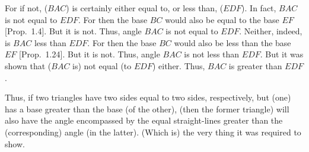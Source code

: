 \begin{Parallel}{}{}
{For if not, ($BAC$) is certainly either equal to, or less than, ($EDF$). In fact, $BAC$ is not equal to
$EDF$. For then the base $BC$ would also be equal to the base $EF$ [Prop.~1.4]. But it is not.
Thus, angle $BAC$ is not equal to $EDF$. Neither, indeed, is $BAC$ less
than $EDF$. For then the base $BC$ would also be less than the base $EF$ [Prop.~1.24].
But it is not. Thus, angle $BAC$ is not less than $EDF$. But it was  shown
that ($BAC$ is) not equal (to $EDF$) either. Thus, $BAC$ is greater than $EDF$.

\epsfysize=2in
\centerline{}

Thus, if two triangles have two sides equal to two sides, respectively,
but (one) has a base greater than the base (of the other), (then the former triangle) will also have the angle encompassed by the equal straight-lines greater than the (corresponding) angle (in the latter). (Which is) the
very thing it was required to show.}
\end{Parallel}

